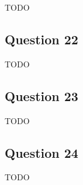 \documentclass[12pt, letterpaper, oneside]{book}
\begin{document}
TODO

\subsection{Question 22}

TODO

\subsection{Question 23}

TODO

\subsection{Question 24}

TODO
\end{document}
